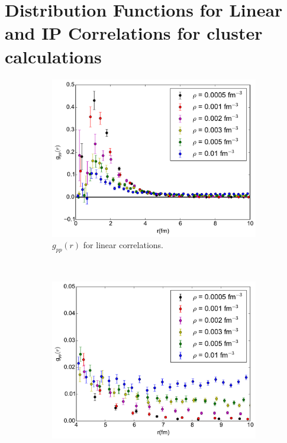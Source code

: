 \documentclass[12pt]{article}
\begin{document}
\section{Distribution Functions for Linear and IP Correlations for cluster calculations}
\begin{figure}[h!]
   \centering
   \begin{subfigure}{0.49\textwidth}
      \includegraphics[width=\textwidth]{../gpp_lin.pdf}
      \caption{$g_{pp}(r)$ for linear correlations.}
   \end{subfigure}
   ~
   \begin{subfigure}{0.49\textwidth}
      \includegraphics[width=\textwidth]{../gpp_lin_small.pdf}

\end{subfigure}
\end{figure}
\end{document}
